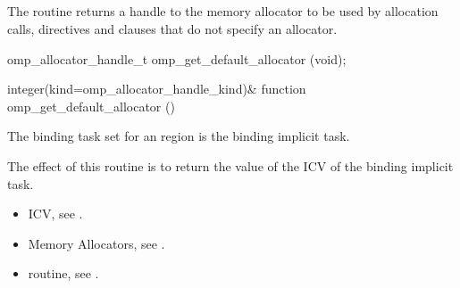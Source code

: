 \subsection{}
\label{subsec:omp_get_default_allocator}

\summary
The  routine returns a handle to 
the memory allocator to be used by allocation calls,  
directives and  clauses that do not specify an allocator.

\format
\begin{ccppspecific}
\begin{ompcFunction}
omp_allocator_handle_t omp_get_default_allocator (void);
\end{ompcFunction}
\end{ccppspecific}
\begin{fortranspecific}
\begin{ompfFunction}
integer(kind=omp_allocator_handle_kind)&
function omp_get_default_allocator ()
\end{ompfFunction}
\end{fortranspecific}

\binding
The binding task set for an  region 
is the binding implicit task.

\effect
The effect of this routine is to return the value of the 
 ICV of the binding implicit task.

\crossreferences
\begin{itemize}
\item {} ICV, see .

\item Memory Allocators, see .

\item {} routine, see .
\end{itemize}



